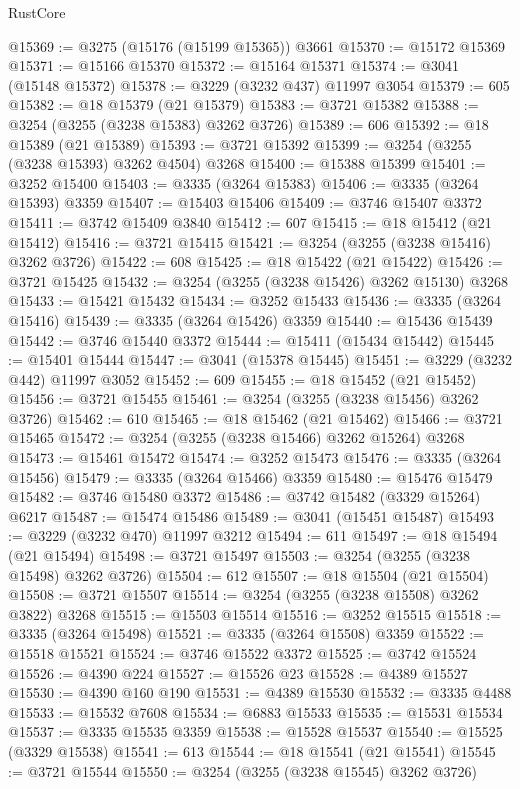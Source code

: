 \begin{lexlean}{RustCore}
\begin{coremodule}
@15369 := @3275 (@15176 (@15199 @15365)) @3661
@15370 := @15172 @15369
@15371 := @15166 @15370
@15372 := @15164 @15371
@15374 := @3041 (@15148 @15372)
@15378 := @3229 (@3232 @437) @11997 @3054
@15379 := 605
@15382 := @18 @15379 (@21 @15379)
@15383 := @3721 @15382
@15388 := @3254 (@3255 (@3238 @15383) @3262 @3726)
@15389 := 606
@15392 := @18 @15389 (@21 @15389)
@15393 := @3721 @15392
@15399 := @3254 (@3255 (@3238 @15393) @3262 @4504) @3268
@15400 := @15388 @15399
@15401 := @3252 @15400
@15403 := @3335 (@3264 @15383)
@15406 := @3335 (@3264 @15393) @3359
@15407 := @15403 @15406
@15409 := @3746 @15407 @3372
@15411 := @3742 @15409 @3840
@15412 := 607
@15415 := @18 @15412 (@21 @15412)
@15416 := @3721 @15415
@15421 := @3254 (@3255 (@3238 @15416) @3262 @3726)
@15422 := 608
@15425 := @18 @15422 (@21 @15422)
@15426 := @3721 @15425
@15432 := @3254 (@3255 (@3238 @15426) @3262 @15130) @3268
@15433 := @15421 @15432
@15434 := @3252 @15433
@15436 := @3335 (@3264 @15416)
@15439 := @3335 (@3264 @15426) @3359
@15440 := @15436 @15439
@15442 := @3746 @15440 @3372
@15444 := @15411 (@15434 @15442)
@15445 := @15401 @15444
@15447 := @3041 (@15378 @15445)
@15451 := @3229 (@3232 @442) @11997 @3052
@15452 := 609
@15455 := @18 @15452 (@21 @15452)
@15456 := @3721 @15455
@15461 := @3254 (@3255 (@3238 @15456) @3262 @3726)
@15462 := 610
@15465 := @18 @15462 (@21 @15462)
@15466 := @3721 @15465
@15472 := @3254 (@3255 (@3238 @15466) @3262 @15264) @3268
@15473 := @15461 @15472
@15474 := @3252 @15473
@15476 := @3335 (@3264 @15456)
@15479 := @3335 (@3264 @15466) @3359
@15480 := @15476 @15479
@15482 := @3746 @15480 @3372
@15486 := @3742 @15482 (@3329 @15264) @6217
@15487 := @15474 @15486
@15489 := @3041 (@15451 @15487)
@15493 := @3229 (@3232 @470) @11997 @3212
@15494 := 611
@15497 := @18 @15494 (@21 @15494)
@15498 := @3721 @15497
@15503 := @3254 (@3255 (@3238 @15498) @3262 @3726)
@15504 := 612
@15507 := @18 @15504 (@21 @15504)
@15508 := @3721 @15507
@15514 := @3254 (@3255 (@3238 @15508) @3262 @3822) @3268
@15515 := @15503 @15514
@15516 := @3252 @15515
@15518 := @3335 (@3264 @15498)
@15521 := @3335 (@3264 @15508) @3359
@15522 := @15518 @15521
@15524 := @3746 @15522 @3372
@15525 := @3742 @15524
@15526 := @4390 @224
@15527 := @15526 @23
@15528 := @4389 @15527
@15530 := @4390 @160 @190
@15531 := @4389 @15530
@15532 := @3335 @4488
@15533 := @15532 @7608
@15534 := @6883 @15533
@15535 := @15531 @15534
@15537 := @3335 @15535 @3359
@15538 := @15528 @15537
@15540 := @15525 (@3329 @15538)
@15541 := 613
@15544 := @18 @15541 (@21 @15541)
@15545 := @3721 @15544
@15550 := @3254 (@3255 (@3238 @15545) @3262 @3726)

\end{coremodule}
\end{lexlean}
